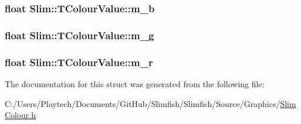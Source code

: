 \subsubsection[{m\+\_\+b}]{\setlength{\rightskip}{0pt plus 5cm}float Slim\+::\+T\+Colour\+Value\+::m\+\_\+b}\label{struct_slim_1_1_t_colour_value_a7d9e36f3e2ae3fe06eef2defdcd4e43f}
\hypertarget{struct_slim_1_1_t_colour_value_a6fe5baf5aeaee1cadfb247ffbadf1a5b}{}
\subsubsection[{m\+\_\+g}]{\setlength{\rightskip}{0pt plus 5cm}float Slim\+::\+T\+Colour\+Value\+::m\+\_\+g}\label{struct_slim_1_1_t_colour_value_a6fe5baf5aeaee1cadfb247ffbadf1a5b}
\hypertarget{struct_slim_1_1_t_colour_value_ac5fb73befbfd2ad8c6d988c194b04275}{}
\subsubsection[{m\+\_\+r}]{\setlength{\rightskip}{0pt plus 5cm}float Slim\+::\+T\+Colour\+Value\+::m\+\_\+r}\label{struct_slim_1_1_t_colour_value_ac5fb73befbfd2ad8c6d988c194b04275}


The documentation for this struct was generated from the following file\+:\begin{DoxyCompactItemize}
\item 
C\+:/\+Users/\+Playtech/\+Documents/\+Git\+Hub/\+Slimfish/\+Slimfish/\+Source/\+Graphics/\hyperlink{_slim_colour_8h}{Slim\+Colour.\+h}\end{DoxyCompactItemize}
